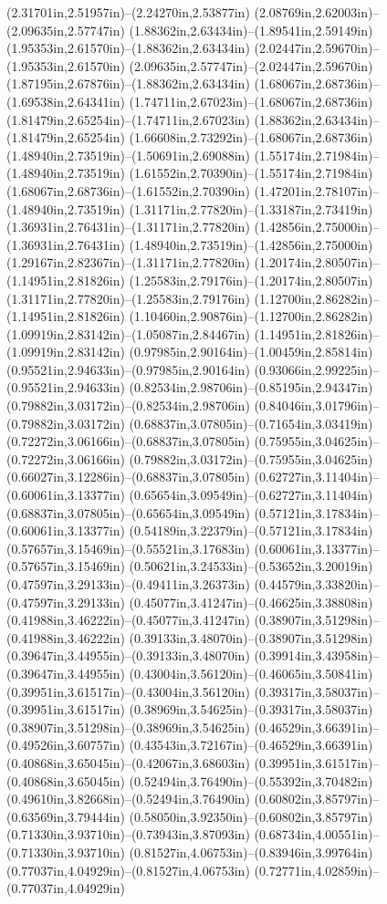 (2.31701in,2.51957in)--(2.24270in,2.53877in) (2.08769in,2.62003in)--(2.09635in,2.57747in) (1.88362in,2.63434in)--(1.89541in,2.59149in) (1.95353in,2.61570in)--(1.88362in,2.63434in) (2.02447in,2.59670in)--(1.95353in,2.61570in) (2.09635in,2.57747in)--(2.02447in,2.59670in) (1.87195in,2.67876in)--(1.88362in,2.63434in) (1.68067in,2.68736in)--(1.69538in,2.64341in) (1.74711in,2.67023in)--(1.68067in,2.68736in) (1.81479in,2.65254in)--(1.74711in,2.67023in) (1.88362in,2.63434in)--(1.81479in,2.65254in) (1.66608in,2.73292in)--(1.68067in,2.68736in) (1.48940in,2.73519in)--(1.50691in,2.69088in) (1.55174in,2.71984in)--(1.48940in,2.73519in) (1.61552in,2.70390in)--(1.55174in,2.71984in) (1.68067in,2.68736in)--(1.61552in,2.70390in) (1.47201in,2.78107in)--(1.48940in,2.73519in) (1.31171in,2.77820in)--(1.33187in,2.73419in) (1.36931in,2.76431in)--(1.31171in,2.77820in) (1.42856in,2.75000in)--(1.36931in,2.76431in) (1.48940in,2.73519in)--(1.42856in,2.75000in) (1.29167in,2.82367in)--(1.31171in,2.77820in) (1.20174in,2.80507in)--(1.14951in,2.81826in) (1.25583in,2.79176in)--(1.20174in,2.80507in) (1.31171in,2.77820in)--(1.25583in,2.79176in) (1.12700in,2.86282in)--(1.14951in,2.81826in) (1.10460in,2.90876in)--(1.12700in,2.86282in) (1.09919in,2.83142in)--(1.05087in,2.84467in) (1.14951in,2.81826in)--(1.09919in,2.83142in) (0.97985in,2.90164in)--(1.00459in,2.85814in) (0.95521in,2.94633in)--(0.97985in,2.90164in) (0.93066in,2.99225in)--(0.95521in,2.94633in) (0.82534in,2.98706in)--(0.85195in,2.94347in) (0.79882in,3.03172in)--(0.82534in,2.98706in) (0.84046in,3.01796in)--(0.79882in,3.03172in) (0.68837in,3.07805in)--(0.71654in,3.03419in) (0.72272in,3.06166in)--(0.68837in,3.07805in) (0.75955in,3.04625in)--(0.72272in,3.06166in) (0.79882in,3.03172in)--(0.75955in,3.04625in) (0.66027in,3.12286in)--(0.68837in,3.07805in) (0.62727in,3.11404in)--(0.60061in,3.13377in) (0.65654in,3.09549in)--(0.62727in,3.11404in) (0.68837in,3.07805in)--(0.65654in,3.09549in) (0.57121in,3.17834in)--(0.60061in,3.13377in) (0.54189in,3.22379in)--(0.57121in,3.17834in) (0.57657in,3.15469in)--(0.55521in,3.17683in) (0.60061in,3.13377in)--(0.57657in,3.15469in) (0.50621in,3.24533in)--(0.53652in,3.20019in) (0.47597in,3.29133in)--(0.49411in,3.26373in) (0.44579in,3.33820in)--(0.47597in,3.29133in) (0.45077in,3.41247in)--(0.46625in,3.38808in) (0.41988in,3.46222in)--(0.45077in,3.41247in) (0.38907in,3.51298in)--(0.41988in,3.46222in) (0.39133in,3.48070in)--(0.38907in,3.51298in) (0.39647in,3.44955in)--(0.39133in,3.48070in) (0.39914in,3.43958in)--(0.39647in,3.44955in) (0.43004in,3.56120in)--(0.46065in,3.50841in) (0.39951in,3.61517in)--(0.43004in,3.56120in) (0.39317in,3.58037in)--(0.39951in,3.61517in) (0.38969in,3.54625in)--(0.39317in,3.58037in) (0.38907in,3.51298in)--(0.38969in,3.54625in) (0.46529in,3.66391in)--(0.49526in,3.60757in) (0.43543in,3.72167in)--(0.46529in,3.66391in) (0.40868in,3.65045in)--(0.42067in,3.68603in) (0.39951in,3.61517in)--(0.40868in,3.65045in) (0.52494in,3.76490in)--(0.55392in,3.70482in) (0.49610in,3.82668in)--(0.52494in,3.76490in) (0.60802in,3.85797in)--(0.63569in,3.79444in) (0.58050in,3.92350in)--(0.60802in,3.85797in) (0.71330in,3.93710in)--(0.73943in,3.87093in) (0.68734in,4.00551in)--(0.71330in,3.93710in) (0.81527in,4.06753in)--(0.83946in,3.99764in) (0.77037in,4.04929in)--(0.81527in,4.06753in) (0.72771in,4.02859in)--(0.77037in,4.04929in) 